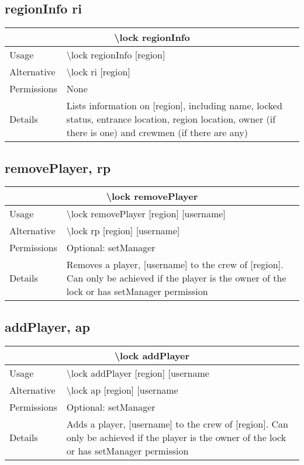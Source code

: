 \documentclass[a4paper,twoside,notitlepage,11pt]{article}
\begin{document}
\subsection{regionInfo ri}
\begin{center}
\begin{tabular}{|p{2cm}|p{12.5cm}|} \hline
\multicolumn{2}{|c|}{\textbf{\textbackslash lock regionInfo}} \\ \hline
Usage       & \textbackslash lock regionInfo [region] \\ \hline
Alternative & \textbackslash lock ri [region] \\ \hline
Permissions & None \\ \hline
Details 	& Lists information on [region], including name, locked status, entrance location, region location, owner (if there is one) and crewmen (if there are any) \\ \hline
\end{tabular}
\end{center}

\subsection{removePlayer, rp}
\begin{center}
\begin{tabular}{|p{2cm}|p{12.5cm}|} \hline
\multicolumn{2}{|c|}{\textbf{\textbackslash lock removePlayer}} \\ \hline
Usage       & \textbackslash lock removePlayer [region] [username] \\ \hline
Alternative & \textbackslash lock rp [region] [username]\\ \hline
Permissions & Optional: setManager \\ \hline
Details 	& Removes a player, [username] to the crew of [region]. Can only be achieved if the player is the owner of the lock or has setManager permission \\ \hline
\end{tabular}
\end{center}

\subsection{addPlayer, ap}
\begin{center}
\begin{tabular}{|p{2cm}|p{12.5cm}|} \hline
\multicolumn{2}{|c|}{\textbf{\textbackslash lock addPlayer}} \\ \hline
Usage       & \textbackslash lock addPlayer [region] [username \\ \hline
Alternative & \textbackslash lock ap [region] [username\\ \hline
Permissions & Optional: setManager \\ \hline
Details 	& Adds a player, [username] to the crew of [region]. Can only be achieved if the player is the owner of the lock or has setManager permission \\ \hline
\end{tabular}
\end{center}
\end{document}
